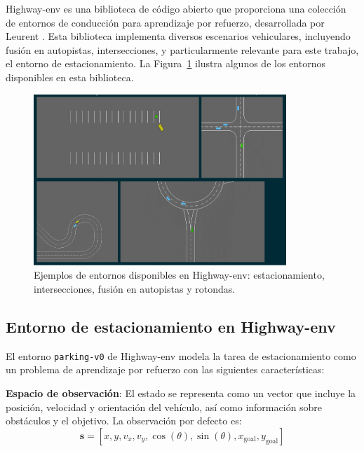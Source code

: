 
Highway-env es una biblioteca de código abierto que proporciona una colección de entornos
de conducción para aprendizaje por refuerzo, desarrollada por Leurent \cite{highway-env}.
Esta biblioteca implementa diversos escenarios vehiculares, incluyendo fusión en autopistas,
intersecciones, y particularmente relevante para este trabajo, el entorno de estacionamiento.
La Figura~\ref{fig:highway-env-scenarios} ilustra algunos de los entornos disponibles en esta biblioteca.

\begin{figure}[!ht]
    \centering
    \includegraphics[width=0.85\textwidth]{img/2-mt/higthway-env.png}
    \caption{Ejemplos de entornos disponibles en Highway-env: estacionamiento, intersecciones, fusión en autopistas y rotondas.}
    \label{fig:highway-env-scenarios}
\end{figure}

\subsection{Entorno de estacionamiento en Highway-env}\label{subsec:highway-env-theory}

El entorno \texttt{parking-v0} de Highway-env modela la tarea de estacionamiento como un
problema de aprendizaje por refuerzo con las siguientes características:


\textbf{Espacio de observación}: El estado se representa como un vector que incluye
la posición, velocidad y orientación del vehículo, así como información sobre
obstáculos y el objetivo. La observación por defecto es:
\begin{equation}
    \mathbf{s} = [x, y, v_x, v_y, \cos(\theta), \sin(\theta), x_{\text{goal}}, y_{\text{goal}}]
\end{equation}


